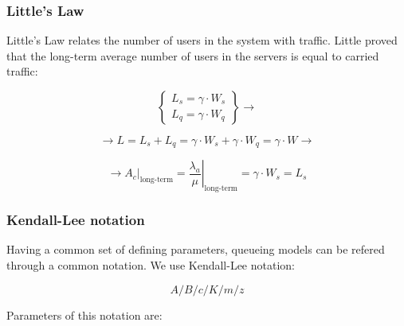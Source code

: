 \documentclass[../main.tex]{subfiles}
\begin{document}
\subsubsection{Little's Law}

Little's Law relates the number of users in the system with traffic. Little proved that the long-term average number of users in the servers is equal to carried traffic:

$$
	\begin{Bmatrix}
		L_s = \gamma \cdot W_s \\
		L_q = \gamma \cdot W_q
	\end{Bmatrix}
	\rightarrow
$$

$$
	\rightarrow
	L = L_s + L_q = \gamma \cdot W_s + \gamma \cdot W_q = \gamma \cdot W
	\rightarrow
$$

$$
	\rightarrow
	\left. A_c \right|_{\textrm{long-term}} = \left. \frac {\lambda_a} {\mu} \right|_{\textrm{long-term}} = \gamma \cdot W_s = L_s
$$

\subsubsection{Kendall-Lee notation}

Having a common set of defining parameters, queueing models can be refered through a common notation. We use Kendall-Lee notation:

$$
	A / B / c / K / m / z
$$

Parameters of this notation are:
\end{document}
